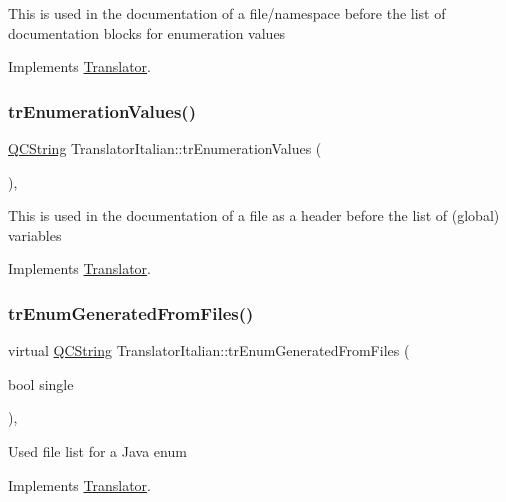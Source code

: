 This is used in the documentation of a file/namespace before the list of documentation blocks for enumeration values 

Implements \mbox{\hyperlink{class_translator}{Translator}}.

\mbox{\label{class_translator_italian_aa0dd9c3f58206afa80914042946da23b}} 
\subsubsection{\texorpdfstring{trEnumerationValues()}{trEnumerationValues()}}
{\footnotesize\ttfamily \mbox{\hyperlink{class_q_c_string}{Q\+C\+String}} Translator\+Italian\+::tr\+Enumeration\+Values (\begin{DoxyParamCaption}{ }\end{DoxyParamCaption})\hspace{0.3cm}{\ttfamily [inline]}, {\ttfamily [virtual]}}

This is used in the documentation of a file as a header before the list of (global) variables 

Implements \mbox{\hyperlink{class_translator}{Translator}}.

\mbox{\label{class_translator_italian_ad35aa813efa08328798c0370df1243d0}} 
\subsubsection{\texorpdfstring{trEnumGeneratedFromFiles()}{trEnumGeneratedFromFiles()}}
{\footnotesize\ttfamily virtual \mbox{\hyperlink{class_q_c_string}{Q\+C\+String}} Translator\+Italian\+::tr\+Enum\+Generated\+From\+Files (\begin{DoxyParamCaption}\item[{bool}]{single }\end{DoxyParamCaption})\hspace{0.3cm}{\ttfamily [inline]}, {\ttfamily [virtual]}}

Used file list for a Java enum 

Implements \mbox{\hyperlink{class_translator}{Translator}}.

